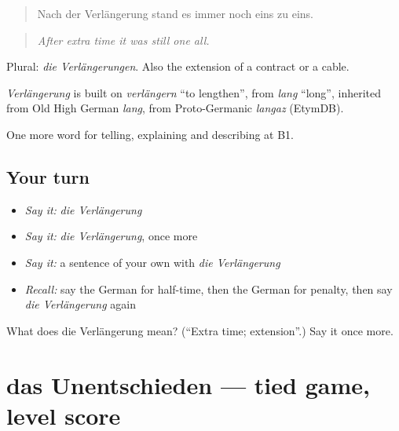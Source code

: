 \begin{quote}
Nach der Verlängerung stand es immer noch eins zu eins.
\end{quote}

\begin{quote}
\emph{After extra time it was still one all.}
\end{quote}

Plural: \emph{die Verlängerungen}. Also the extension of a contract or a cable.

\begin{cousinweb}
\emph{Verlängerung} is built on \emph{verlängern} \textquotedblleft{}to lengthen\textquotedblright{}, from \emph{lang} \textquotedblleft{}long\textquotedblright{}, inherited from Old High German \emph{lang}, from Proto-Germanic \emph{langaz} (EtymDB).
\end{cousinweb}

\begin{grammarlens}[title={What you've built}]
One more word for telling, explaining and describing at B1.
\end{grammarlens}

\subsection*{Your turn}
\begin{itemize}
\raggedright
  \item \emph{Say it:} \emph{die Verlängerung}
  \item \emph{Say it:} \emph{die Verlängerung}, once more
  \item \emph{Say it:} a sentence of your own with \emph{die Verlängerung}
  \item \emph{Recall:} say the German for half-time, then the German for penalty, then say \emph{die Verlängerung} again
\end{itemize}

\begin{tcolorbox}[breakable,colback=teal!4,colframe=teal!35!black,title={Before you move on}]
What does die Verlängerung mean? (\textquotedblleft{}Extra time; extension\textquotedblright{}.) Say it once more.
\end{tcolorbox}
\section[das Unentschieden]{das Unentschieden — tied game, level score}

\label{lesson:GE-C507-unentschieden}



